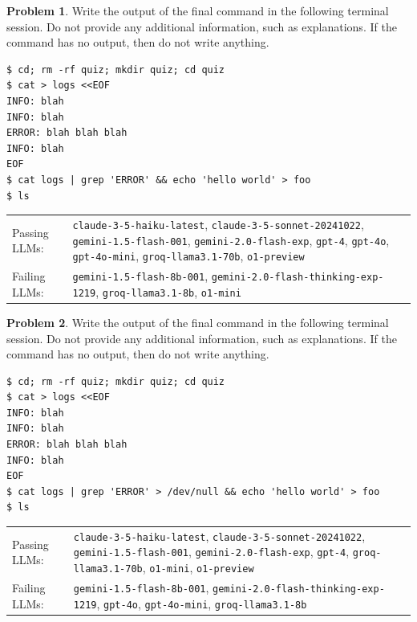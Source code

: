 \documentclass[10pt]{article}
\theoremstyle{definition}
\newtheorem{problem}{Problem}
\begin{document}
\noindent\vspace{0.1in}\begin{minipage}{\textwidth}

\begin{problem}
Write the output of the final command in the following terminal session.
Do not provide any additional information,
such as explanations.
If the command has no output,
then do not write anything.

\end{problem}
\begin{lstlisting}
$ cd; rm -rf quiz; mkdir quiz; cd quiz
$ cat > logs <<EOF
INFO: blah
INFO: blah
ERROR: blah blah blah
INFO: blah
EOF
$ cat logs | grep 'ERROR' && echo 'hello world' > foo
$ ls
\end{lstlisting}


\noindent
\begin{tabular}{p{1.0in}L{5in}}
Passing LLMs: & {\lstinline$claude-3-5-haiku-latest$}, {\lstinline$claude-3-5-sonnet-20241022$}, {\lstinline$gemini-1.5-flash-001$}, {\lstinline$gemini-2.0-flash-exp$}, {\lstinline$gpt-4$}, {\lstinline$gpt-4o$}, {\lstinline$gpt-4o-mini$}, {\lstinline$groq-llama3.1-70b$}, {\lstinline$o1-preview$} \\
Failing LLMs: & {\lstinline$gemini-1.5-flash-8b-001$}, {\lstinline$gemini-2.0-flash-thinking-exp-1219$}, {\lstinline$groq-llama3.1-8b$}, {\lstinline$o1-mini$} \\
\end{tabular}

\end{minipage}
\noindent\vspace{0.1in}\begin{minipage}{\textwidth}

\begin{problem}
Write the output of the final command in the following terminal session.
Do not provide any additional information,
such as explanations.
If the command has no output,
then do not write anything.

\end{problem}
\begin{lstlisting}
$ cd; rm -rf quiz; mkdir quiz; cd quiz
$ cat > logs <<EOF
INFO: blah
INFO: blah
ERROR: blah blah blah
INFO: blah
EOF
$ cat logs | grep 'ERROR' > /dev/null && echo 'hello world' > foo
$ ls
\end{lstlisting}


\noindent
\begin{tabular}{p{1.0in}L{5in}}
Passing LLMs: & {\lstinline$claude-3-5-haiku-latest$}, {\lstinline$claude-3-5-sonnet-20241022$}, {\lstinline$gemini-1.5-flash-001$}, {\lstinline$gemini-2.0-flash-exp$}, {\lstinline$gpt-4$}, {\lstinline$groq-llama3.1-70b$}, {\lstinline$o1-mini$}, {\lstinline$o1-preview$} \\
Failing LLMs: & {\lstinline$gemini-1.5-flash-8b-001$}, {\lstinline$gemini-2.0-flash-thinking-exp-1219$}, {\lstinline$gpt-4o$}, {\lstinline$gpt-4o-mini$}, {\lstinline$groq-llama3.1-8b$} \\
\end{tabular}

\end{minipage}
\end{document}
